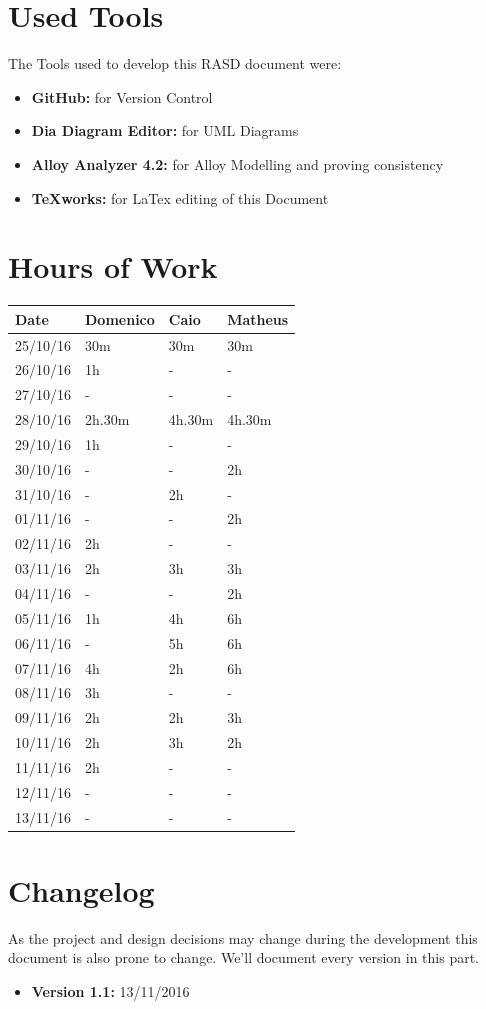 \documentclass[a4paper]{article}
\begin{document}
\section{Used Tools}
The Tools used to develop this RASD document were:
\begin{itemize}
	\item \textbf{GitHub:} for Version Control
	\item \textbf {Dia Diagram Editor:} for UML Diagrams
	\item \textbf{Alloy Analyzer 4.2:} for Alloy Modelling and proving consistency 
	\item \textbf {TeXworks:} for LaTex editing of this Document
\end{itemize}
\newpage

\section{Hours of Work}
\begin{tabular}{ | l | l | l | l | }
\hline
	\textbf {Date} & \textbf {Domenico} & \textbf {Caio} & \textbf {Matheus} \\ \hline
	25/10/16& 30m & 30m & 30m \\ \hline
	26/10/16& 1h & -  & -  \\ \hline
	27/10/16&  - & - & -  \\ \hline
	28/10/16& 2h.30m & 4h.30m & 4h.30m \\ \hline
	29/10/16& 1h & -  & - \\ \hline
	30/10/16&  - & - & 2h\\ \hline
	31/10/16&  - & 2h & - \\ \hline
	01/11/16&  - & - & 2h \\ \hline
	02/11/16&  2h & - & - \\ \hline
	03/11/16&  2h & 3h & 3h \\ \hline
	04/11/16&  - & - & 2h\\ \hline
	05/11/16&  1h & 4h &  6h\\ \hline
	06/11/16&  - & 5h & 6h\\ \hline
	07/11/16& 4h & 2h & 6h \\ \hline
	08/11/16&  3h & - & - \\ \hline
	09/11/16&  2h & 2h & 3h \\ \hline
	10/11/16&  2h & 3h & 2h\\ \hline
	11/11/16&  2h & - & - \\ \hline
	12/11/16&  - & - & - \\ \hline
	13/11/16&  - & - & - \\ \hline
\end{tabular}

\newpage

\section{Changelog}
As the project and design decisions may change during the development this document is also prone to change.
We'll document every version in this part.
\begin{itemize}
\item \textbf {Version 1.1:} 13/11/2016
\end{itemize}
\end{document}
